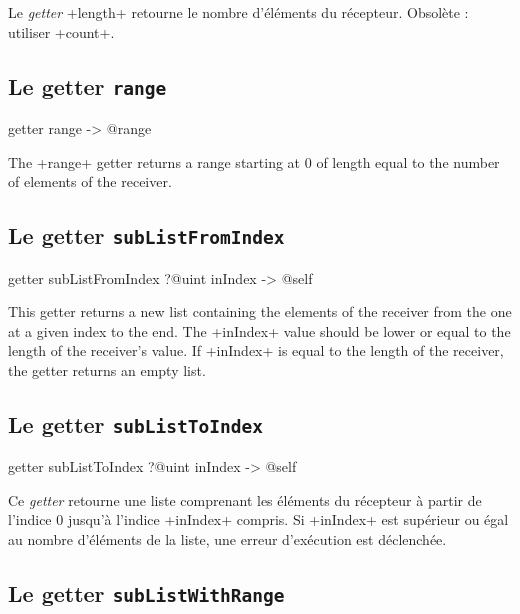 Le \emph{getter} \ggsq+length+ retourne le nombre d'éléments du récepteur. Obsolète : utiliser \ggsq+count+.


\subsection{Le getter \texttt{range}}

\begin{galgas4}
getter range -> @range
\end{galgas4}

The \ggsq+range+ getter returns a range starting at $0$ of length equal to the number of elements of the receiver.




\subsection{Le getter \texttt{subListFromIndex}}

\begin{galgas4}
getter subListFromIndex ?@uint inIndex -> @self
\end{galgas4}

This getter returns a new list containing the elements of the receiver from the one at a given index to the end. The  \ggsq+inIndex+ value should be lower or equal to the length of the receiver's value. If \ggsq+inIndex+ is equal to the length of the receiver, the getter returns an empty list.






\subsection{Le getter \texttt{subListToIndex}}

\begin{galgas4}
getter subListToIndex ?@uint inIndex -> @self
\end{galgas4}

Ce \emph{getter} retourne une liste comprenant les éléments du récepteur à partir de l'indice $0$ jusqu'à l'indice \ggsq+inIndex+ compris. Si \ggsq+inIndex+ est supérieur ou égal au nombre d'éléments de la liste, une erreur d'exécution est déclenchée.




\subsection{Le getter \texttt{subListWithRange}}

